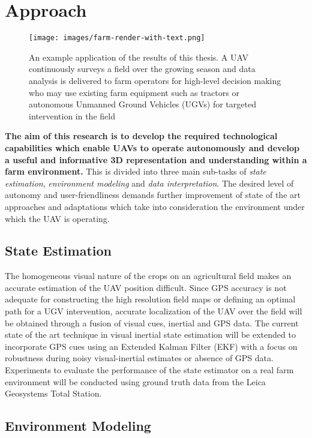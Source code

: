 \section{Approach}
\label{sec:Approach}

\begin{figure}[h]
   \centering
    \texttt{[image: images/farm-render-with-text.png]}
    \caption{An example application of the results of this thesis. A UAV continuously surveys a field over the growing season and data analysis is delivered to farm operators for high-level decision making who may use existing farm equipment such as tractors or autonomous Unmanned Ground Vehicles (UGVs) for targeted intervention in the field}
    \label{fig:concept-overview}
\end{figure}

\textbf{The aim of this research is to develop the required technological capabilities which enable UAVs to operate autonomously and develop a useful and informative 3D representation and understanding within a farm environment.} This is divided into three main sub-tasks of \textit{state estimation}, \textit{environment modeling} and \textit{data interpretation}. The desired level of autonomy and user-friendliness demands further improvement of state of the art approaches and adaptations which take into consideration the environment under which the UAV is operating.


\subsection{State Estimation}
	
 The homogeneous visual nature of the crops on an agricultural field makes an accurate estimation of the UAV position difficult. Since GPS accuracy is not adequate for constructing the high resolution field maps or defining an optimal path for a UGV intervention, accurate localization of the UAV over the field will be obtained through a fusion of visual cues, inertial and GPS data. The current state of the art technique in visual inertial state estimation \cite{leutenegger2013keyframe} will be extended to incorporate GPS cues using an Extended Kalman Filter (EKF) with a focus on robustness during noisy visual-inertial estimates or absence of GPS data. Experiments to evaluate the performance of the state estimator on a real farm environment will be conducted using ground truth data from the Leica Geosystems Total Station.
	
\subsection{Environment Modeling}

